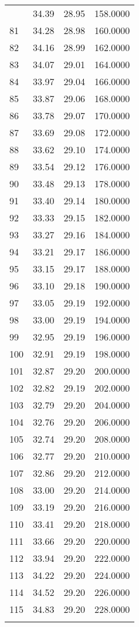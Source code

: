 \documentclass[
  captions=tableheading,
]{scrartcl}
\begin{document}
\begin{longtable} {l|l|l|l}
{80	& 34.39	& 28.95	& 158.0000\\
81	& 34.28	& 28.98	& 160.0000\\
82	& 34.16	& 28.99	& 162.0000\\
83	&  34.07 & 29.01	& 164.0000\\
84	& 33.97	& 29.04	& 166.0000\\
85	& 33.87	& 29.06	& 168.0000\\
86	& 33.78	& 29.07	& 170.0000\\
87	& 33.69	& 29.08	& 172.0000\\
88	& 33.62	& 29.10	& 174.0000\\
89	& 33.54	& 29.12	& 176.0000\\
90	& 33.48	& 29.13	& 178.0000\\
91	& 33.40	& 29.14	& 180.0000\\
92	& 33.33	& 29.15	& 182.0000\\
93	& 33.27	& 29.16	& 184.0000\\
94	& 33.21	& 29.17	& 186.0000\\
95	& 33.15	& 29.17	& 188.0000\\
96	& 33.10	& 29.18	& 190.0000\\
97	& 33.05	& 29.19	& 192.0000\\
98	& 33.00	& 29.19	& 194.0000\\
99	 & 32.95 & 29.19 & 196.0000\\
100 &	32.91 &	29.19 &	198.0000\\
101 &	32.87 &	29.20 &	200.0000\\
102 &	32.82 &	29.19 &	202.0000\\
103 &	32.79 &	29.20 &	204.0000\\
104 &	32.76 &	29.20 &	206.0000\\
105 &	32.74 &	29.20 &	208.0000\\
106 &	32.77 &	29.20 &	210.0000\\
107 &	32.86 &	29.20 &	212.0000\\
108 &	33.00 &	29.20 &	214.0000\\
109 &	33.19 &	29.20 &	216.0000\\
110 &	33.41 &	29.20 &	218.0000\\
111 &	33.66 &	29.20 &	220.0000\\
112 &	33.94 &	29.20 &	222.0000\\
113 &	34.22 &	29.20 &	224.0000\\
114 &	34.52 &	29.20 &	226.0000\\
115 &	34.83 &	29.20 &	228.0000\\
}
\end{longtable}
\end{document}
